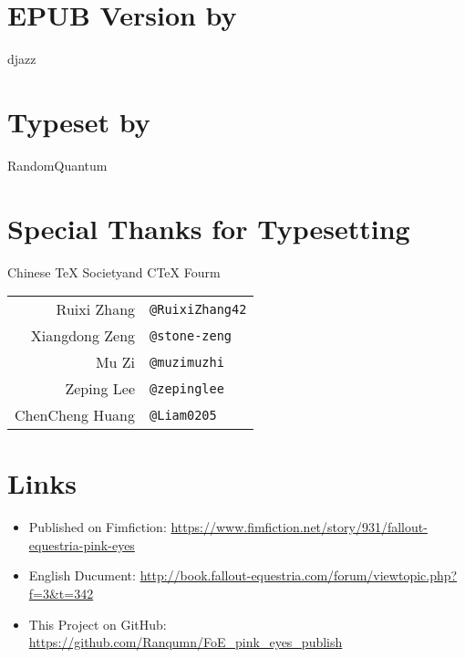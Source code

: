 \section*{EPUB Version by}

\begin{center}
    djazz
\end{center}

\section*{Typeset by}

\begin{center}
    RandomQuantum
\end{center}

\section*{Special Thanks for Typesetting}

\begin{table}[H]
    \centering
    
    \begin{center}
    Chinese \TeX{} Society\footnotemark and C\TeX{} Fourm\footnotemark
    \end{center}
  
    \begin{tabular}{rl}
        Ruixi Zhang & \texttt{@RuixiZhang42} \\
        Xiangdong Zeng & \texttt{@stone-zeng} \\
        Mu Zi & \texttt{@muzimuzhi} \\
        Zeping Lee & \texttt{@zepinglee} \\
        ChenCheng Huang & \texttt{@Liam0205} \\
    \end{tabular}
\end{table}

\addtocounter{footnote}{-2} %



\section*{Links}

\begin{itemize}
    \item Published on Fimfiction: \url{https://www.fimfiction.net/story/931/fallout-equestria-pink-eyes}
    \item English Ducument: \url{http://book.fallout-equestria.com/forum/viewtopic.php?f=3\&t=342}
    \item This Project on GitHub: \url{https://github.com/Ranqumn/FoE_pink_eyes_publish}
\end{itemize}


